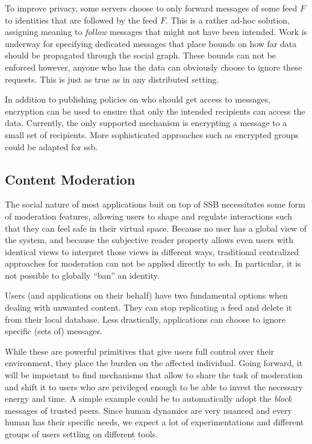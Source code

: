 \documentclass[sigconf]{acmart}
\begin{document}
To improve privacy, some servers choose to only forward messages of some feed $F$ to identities that are followed by the feed $F$. This is a rather ad-hoc solution, assigning meaning to \textit{follow} messages that might not have been intended. Work is underway for specifying dedicated messages that place bounds on how far data should be propagated through the social graph. These bounds can not be enforced however, anyone who has the data can obviously choose to ignore these requests. This is just as true as in any distributed setting.

In addition to publishing policies on who should get access to messages, encryption can be used to ensure that only the intended recipients can access the data. Currently, the only supported mechanism is encrypting a message to a small set of recipients. More sophisticated approaches such as encrypted groups could be adapted for ssb.

\subsection{Content Moderation}

The social nature of most applications buit on top of SSB necessitates some form of moderation features, allowing users to shape and regulate interactions such that they can feel safe in their virtual space. Because no user has a global view of the system, and because the subjective reader property allows even users with identical views to interpret those views in different ways, traditional centralized approaches for moderation can not be applied directly to ssb. In particular, it is not possible to globally ``ban'' an identity.

Users (and applications on their behalf) have two fundamental options when dealing with unwanted content. They can stop replicating a feed and delete it from their local database. Less drastically, applications can choose to ignore specific (sets of) messages.

While these are powerful primitives that give users full control over their environment, they place the burden on the affected individual. Going forward, it will be important to find mechanisms that allow to share the task of moderation and shift it to users who are privileged enough to be able to invest the necessary energy and time. A simple example could be to automatically adopt the \textit{block} messages of trusted peers. Since human dynamics are very nuanced and every human has their specific needs, we expect a lot of experimentations and different groups of users settling on different tools.
\end{document}

